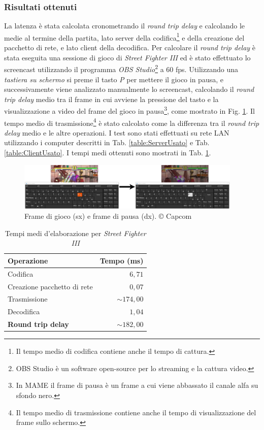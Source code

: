 \subsubsection{Risultati ottenuti}
La latenza è stata calcolata cronometrando il \textit{round trip delay} e calcolando le medie al termine della partita, lato server della codifica\footnote{Il tempo medio di codifica contiene anche il tempo di cattura.} e della creazione del pacchetto di rete, e lato client della decodifica. Per calcolare il \textit{round trip delay} è stata eseguita una sessione di gioco di \textit{Street Fighter III} ed è stato effettuato lo screencast utilizzando il programma \textit{OBS Studio}\footnote{OBS Studio è un software open-source per lo streaming e la cattura video.} a 60 fps. Utilizzando una \textit{tastiera su schermo} si preme il tasto \textit{P} per mettere il gioco in pausa, e successivamente viene analizzato manualmente lo screencast, calcolando il \textit{round trip delay} medio tra il frame in cui avviene la pressione del tasto e la visualizzazione a video del frame del gioco in pausa\footnote{In MAME il frame di pausa è un frame a cui viene abbassato il canale alfa su sfondo nero.}, come mostrato in Fig. \ref{fig:pause}. Il tempo medio di trasmissione\footnote{Il tempo medio di trasmissione contiene anche il tempo di visualizzazione del frame sullo schermo.} è stato calcolato come la differenza tra il \textit{round trip delay} medio e le altre operazioni. I test sono stati effettuati su rete LAN utilizzando i computer descritti in Tab. \ref{table:ServerUsato} e Tab. \ref{table:ClientUsato}. I tempi medi ottenuti sono mostrati in Tab. \ref{table:LatenzaOttenuta}.

\begin{figure}[H]
	\centering
	\includegraphics[height=2.3cm]{immagini/pause}
	\caption{Frame di gioco (sx) e frame di pausa (dx). © Capcom}	
	\label{fig:pause}
\end{figure}

\begin{table}[H]
	\centering
	\begin{tabular}{||l r||}
		\hline
		Operazione & Tempo (ms) \\
		\hline\hline
		\hline
		Codifica & $6,71$ \\
		\hline
		Creazione pacchetto di rete & $0,07$ \\
		\hline
		Trasmissione & $\sim 174,00$ \\
		\hline
		Decodifica & $1,04$ \\
		\hline\hline
		\textbf{Round trip delay} & \textbf{$\sim 182,00$} \\
		\hline
	\end{tabular}

	\caption{Tempi medi d'elaborazione per \textit{Street Fighter III}}
	\label{table:LatenzaOttenuta}
\end{table}

